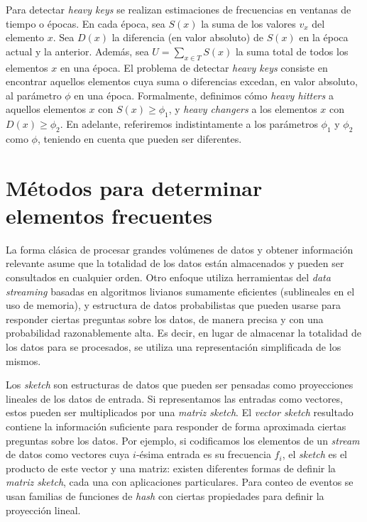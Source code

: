 \documentclass[a4paper,10pt, oneside]{article}
\begin{document}
Para detectar \textit{heavy keys} se realizan estimaciones de frecuencias en ventanas de tiempo o épocas. En cada época, sea $S(x)$ la suma de los valores $v_x$ del elemento $x$. Sea $D(x)$ la diferencia (en valor absoluto) de $S(x)$ en la época actual y la anterior. Además, sea $U=\sum_{x \in T} S(x)$ la suma total de todos los elementos $x$ en una época. El problema de detectar \textit{heavy keys} consiste en encontrar aquellos elementos cuya suma o diferencias excedan, en valor absoluto, al parámetro $\phi$ en una época. Formalmente, definimos cómo \textit{heavy hitters} a aquellos elementos $x$ con $S(x) \geq \phi_1$, y \textit{heavy changers} a los elementos $x$ con $D(x) \geq \phi_2$. En adelante, referiremos indistintamente a los parámetros $\phi_1$ y $\phi_2$ como $\phi$, teniendo en cuenta que pueden ser diferentes.

\section{Métodos para determinar elementos frecuentes}

La forma clásica de procesar grandes volúmenes de datos y obtener información relevante asume que la totalidad de los datos están almacenados y pueden ser consultados en cualquier orden. Otro enfoque utiliza herramientas del \textit{data streaming} basadas en algoritmos livianos sumamente eficientes (sublineales en el uso de memoria), y estructura de datos probabilistas que pueden usarse para responder ciertas preguntas sobre los datos, de manera precisa y con una probabilidad razonablemente alta. Es decir, en lugar de almacenar la totalidad de los datos para se procesados, se utiliza una representación simplificada de los mismos.

Los \textit{sketch} son estructuras de datos que pueden ser pensadas como proyecciones lineales de los datos de entrada. Si representamos las entradas como vectores, estos pueden ser multiplicados por una \textit{matriz sketch}. El \textit{vector sketch} resultado contiene la  información suficiente para responder de forma aproximada ciertas preguntas sobre los datos. Por ejemplo, si codificamos los elementos de un \textit{stream} de datos como vectores cuya $i$-ésima entrada es su frecuencia $f_i$, el \textit{sketch} es el producto de este vector y una matriz: existen diferentes formas de definir la \textit{matriz sketch}, cada una con aplicaciones particulares. Para conteo de eventos se usan familias de funciones de \textit{hash} con ciertas propiedades para definir la proyección lineal.
\end{document}
